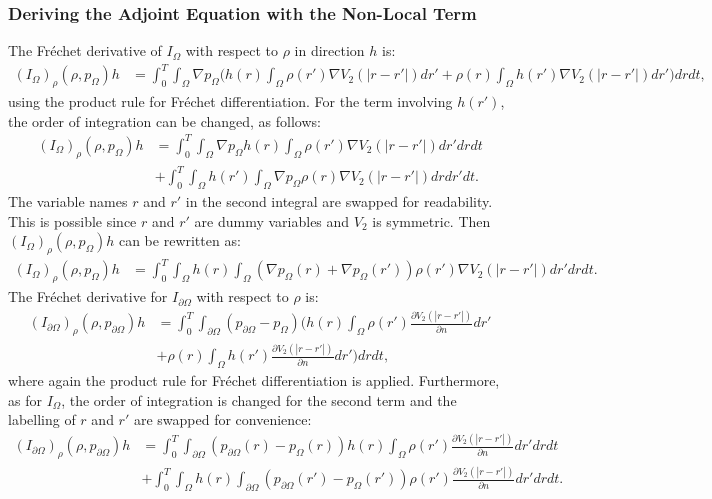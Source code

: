 \subsubsection{Deriving the Adjoint Equation with the Non-Local Term}
The Fr\'echet derivative of $I_\Omega$ with respect to $\rho$ in direction $h$ is:
\begin{align*}
({I_\Omega})_\rho(\rho,p_\Omega)h &= \int_0^T \int_\Omega \nabla  p_\Omega \bigg( h(r) \int_\Omega \rho(r') \nabla V_2(|r-r'|) dr' + \rho(r) \int_\Omega h(r') \nabla V_2(|r-r'|) dr' \bigg)  dr dt,
\end{align*}
using the product rule for Fr\'echet differentiation.
For the term involving $h(r')$, the order of integration can be changed, as follows:
\begin{align*}
({I_\Omega})_\rho(\rho,p_\Omega)h &= \int_0^T \int_\Omega \nabla  p_\Omega  h(r) \int_\Omega \rho(r') \nabla V_2(|r-r'|) dr' dr dt \\
&+\int_0^T \int_\Omega h(r')  \int_\Omega \nabla  p_\Omega \rho(r) \nabla V_2(|r-r'|) dr dr' dt.
\end{align*} 
The variable names $r$ and $r'$ in the second integral are swapped for readability. This is possible since $r$ and $r'$ are dummy variables and $V_2$ is symmetric. Then $({I_\Omega})_\rho(\rho,p_\Omega)h$ can be rewritten as:
\begin{align*}
({I_\Omega})_\rho(\rho,p_\Omega)h &= \int_0^T \int_\Omega  h(r) \int_\Omega (\nabla  p_\Omega(r)+\nabla  p_\Omega(r')) \rho(r') \nabla V_2(|r-r'|) dr' dr dt .
\end{align*} 
The Fr\'echet derivative for $I_{\partial \Omega}$ with respect to $\rho$ is:
\begin{align*}
({I_{\partial \Omega}})_\rho(\rho,p_{\partial \Omega})h&=\int_0^T \int_{\partial \Omega} ( p_{\partial \Omega} - p_\Omega) \bigg( h(r)  \int_\Omega \rho(r') \frac{\partial V_2(|r-r'|)}{\partial n} dr'\\
&+ \rho(r)  \int_\Omega h(r') \frac{\partial V_2(|r-r'|)}{\partial n} dr' \bigg)dr dt,
\end{align*}
where again the product rule for Fr\'echet differentiation is applied. Furthermore, as for $I_\Omega$, the order of integration is changed for the second term and the labelling of $r$ and $r'$ are swapped for convenience:
\begin{align*}
({I_{\partial \Omega}})_\rho(\rho,p_{\partial \Omega})h&=\int_0^T \int_{\partial \Omega} ( p_{\partial \Omega}(r) - p_\Omega(r)) h(r)  \int_\Omega \rho(r') \frac{\partial V_2(|r-r'|)}{\partial n} dr' dr dt \\
&+ \int_0^T \int_\Omega h(r)\int_{\partial \Omega} ( p_{\partial \Omega}(r') - p_\Omega(r')) \rho(r')   \frac{\partial V_2(|r-r'|)}{\partial n} dr' dr dt.
\end{align*}
